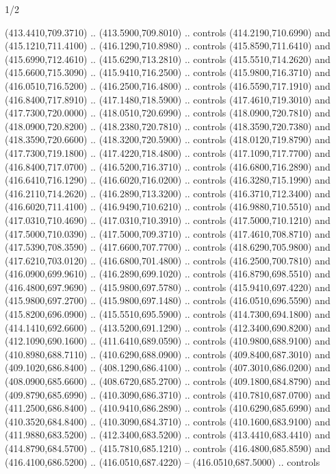 \begin{flagdescription}{1/2}
\begin{scope}[xshift=0.5\flaglength]
\begin{scope}[scale=0.00745\flagwidth,xshift=-12.1mm,yshift=41.7mm]
\begin{scope}[y=0.80pt, x=0.80pt, yscale=-1, xscale=1, inner sep=0pt, outer sep=0pt]
\begin{scope}[cm={{1.33333,0.0,0.0,-1.33333,(0.0,114.66667)}}]
\begin{scope}[scale=0.100]
  (413.4410,709.3710) .. (413.5900,709.8010) .. controls (414.2190,710.6990) and
  (415.1210,711.4100) .. (416.1290,710.8980) .. controls (415.8590,711.6410) and
  (415.6990,712.4610) .. (415.6290,713.2810) .. controls (415.5510,714.2620) and
  (415.6600,715.3090) .. (415.9410,716.2500) .. controls (415.9800,716.3710) and
  (416.0510,716.5200) .. (416.2500,716.4800) .. controls (416.5590,717.1910) and
  (416.8400,717.8910) .. (417.1480,718.5900) .. controls (417.4610,719.3010) and
  (417.7300,720.0000) .. (418.0510,720.6990) .. controls (418.0900,720.7810) and
  (418.0900,720.8200) .. (418.2380,720.7810) .. controls (418.3590,720.7380) and
  (418.3590,720.6600) .. (418.3200,720.5900) .. controls (418.0120,719.8790) and
  (417.7300,719.1800) .. (417.4220,718.4800) .. controls (417.1090,717.7700) and
  (416.8400,717.0700) .. (416.5200,716.3710) .. controls (416.6800,716.2890) and
  (416.6410,716.1290) .. (416.6020,716.0200) .. controls (416.3280,715.1990) and
  (416.2110,714.2620) .. (416.2890,713.3200) .. controls (416.3710,712.3400) and
  (416.6020,711.4100) .. (416.9490,710.6210) .. controls (416.9880,710.5510) and
  (417.0310,710.4690) .. (417.0310,710.3910) .. controls (417.5000,710.1210) and
  (417.5000,710.0390) .. (417.5000,709.3710) .. controls (417.4610,708.8710) and
  (417.5390,708.3590) .. (417.6600,707.7700) .. controls (418.6290,705.9800) and
  (417.6210,703.0120) .. (416.6800,701.4800) .. controls (416.2500,700.7810) and
  (416.0900,699.9610) .. (416.2890,699.1020) .. controls (416.8790,698.5510) and
  (416.4800,697.9690) .. (415.9800,697.5780) .. controls (415.9410,697.4220) and
  (415.9800,697.2700) .. (415.9800,697.1480) .. controls (416.0510,696.5590) and
  (415.8200,696.0900) .. (415.5510,695.5900) .. controls (414.7300,694.1800) and
  (414.1410,692.6600) .. (413.5200,691.1290) .. controls (412.3400,690.8200) and
  (412.1090,690.1600) .. (411.6410,689.0590) .. controls (410.9800,688.9100) and
  (410.8980,688.7110) .. (410.6290,688.0900) .. controls (409.8400,687.3010) and
  (409.1020,686.8400) .. (408.1290,686.4100) .. controls (407.3010,686.0200) and
  (408.0900,685.6600) .. (408.6720,685.2700) .. controls (409.1800,684.8790) and
  (409.8790,685.6990) .. (410.3090,686.3710) .. controls (410.7810,687.0700) and
  (411.2500,686.8400) .. (410.9410,686.2890) .. controls (410.6290,685.6990) and
  (410.3520,684.8400) .. (410.3090,684.3710) .. controls (410.1600,683.9100) and
  (411.9880,683.5200) .. (412.3400,683.5200) .. controls (413.4410,683.4410) and
  (414.8790,684.5700) .. (415.7810,685.1210) .. controls (416.4800,685.8590) and
  (416.4100,686.5200) .. (416.0510,687.4220) -- (416.0510,687.5000) .. controls

\end{scope}
\end{scope}
\end{scope}
\end{scope}
\end{scope}
\end{flagdescription}
